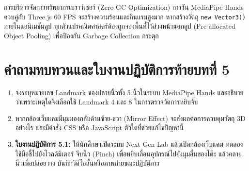 \begin{tipbox}{การบริหารจัดการทรัพยากรเบราว์เซอร์ (Zero-GC Optimization)}
การรัน MediaPipe Hands ควบคู่กับ Three.js 60 FPS จะสร้างความร้อนและกินแรมสูงมาก หากสร้างวัตถุ \texttt{new Vector3()} ภายในแอนิเมชันลูป ทุกตัวแปรคณิตศาสตร์ต้องถูกจองพื้นที่ไว้ล่วงหน้านอกลูป (Pre-allocated Object Pooling) เพื่อป้องกัน Garbage Collection กระตุก
\end{tipbox}

\section*{คำถามทบทวนและใบงานปฏิบัติการท้ายบทที่ 5}

\begin{enumerate}[leftmargin=1.5em, itemsep=8pt]
    \item จงระบุหมายเลข Landmark ของปลายนิ้วทั้ง 5 นิ้วในระบบ MediaPipe Hands และอธิบายว่าเพราะเหตุใดจึงเลือกใช้ Landmark 4 และ 8 ในการตรวจวัดการหยิบจับ
    \item หากกล้องเว็บแคมมีมุมมองกลับด้านซ้าย-ขวา (Mirror Effect) จะส่งผลต่อการควบคุมวัตถุ 3D อย่างไร และมีคำสั่ง CSS หรือ JavaScript ตัวใดที่ช่วยแก้ไขปัญหานี้
    \item \textbf{ใบงานปฏิบัติการ 5.1:} ให้นักศึกษาเปิดระบบ Next Gen Lab แล้วเปิดกล้องเว็บแคม ทดลองใช้มือชี้ไปยังโวลต์มิเตอร์ จีบนิ้ว (Pinch) เพื่อหยิบเลื่อนอุปกรณ์ไปยังมุมอื่นของโต๊ะ แล้วคลายนิ้วเพื่อปล่อยวาง บันทึกวิดีโอสั้นหรือภาพถ่ายขณะปฏิบัติการ
\end{enumerate}
